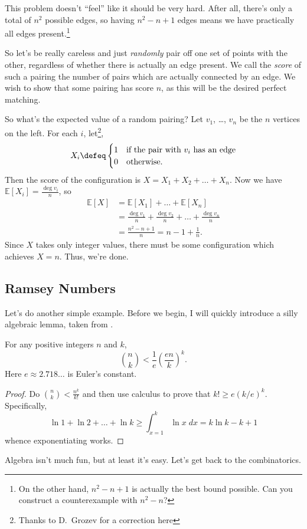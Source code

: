 \documentclass[11pt]{scrartcl}
\newcommand\EE{\mathbb E}
\begin{document}
This problem doesn't ``feel'' like it should be very hard.
After all, there's only a total of $n^2$ possible edges,
so having $n^2-n+1$ edges means we have practically all edges present.\footnote{On the other hand, $n^2-n+1$ is actually the best bound possible. Can you construct a counterexample with $n^2-n$?}

So let's be really careless and just \emph{randomly} pair off one set of points with the other,
regardless of whether there is actually an edge present.
We call the \emph{score} of such a pairing the number of pairs which are actually connected by an edge.
We wish to show that some pairing has score $n$, as this will be the desired perfect matching.

So what's the expected value of a random pairing?
Let $v_1$, \dots, $v_n$ be the $n$ vertices on the left.
For each $i$, let\footnote{Thanks to D.\ Grozev for a correction here},
\[
  X_i \defeq
  \begin{cases}
    1 & \text{if the pair with $v_i$ has an edge} \\
    0 & \text{otherwise}.
  \end{cases}
\]
Then the score of the configuration is $X = X_1 + X_2 + \dots + X_n$.
Now we have $\EE[X_i] = \frac{\deg v_i}{n}$, so
\begin{align*}
  \EE[X] &= \EE[X_1] + \dots + \EE[X_n] \\
  &= \frac{\deg v_1}{n} + \frac{\deg v_2}{n} + \dots + \frac{\deg v_n}{n} \\
  &= \frac{n^2-n+1}{n} = n-1 + \frac 1n.
\end{align*}
Since $X$ takes only integer values,
there must be some configuration which achieves $X=n$.
Thus, we're done.

\subsection{Ramsey Numbers}
Let's do another simple example. Before we begin, I will quickly introduce a silly algebraic lemma,
taken from \cite[page 30]{holden}.
\begin{lemma}
  For any positive integers $n$ and $k$,
  \[ \binom nk < \frac 1e \left( \frac{en}{k} \right)^k. \]
  Here $e \approx 2.718\dots$ is Euler's constant.
  \label{lem:binom_bound}
\end{lemma}
\begin{proof}
  Do $\binom nk < \frac{n^k}{k!}$ and then use calculus to prove that
  $k! \ge e(k/e)^k$. Specifically,
  \[ \ln 1 + \ln 2 + \dots + \ln k \ge \int_{x=1}^k \ln x \; dx = k \ln k - k + 1 \]
  whence exponentiating works.
\end{proof}
Algebra isn't much fun, but at least it's easy. Let's get back to the combinatorics.
\end{document}
